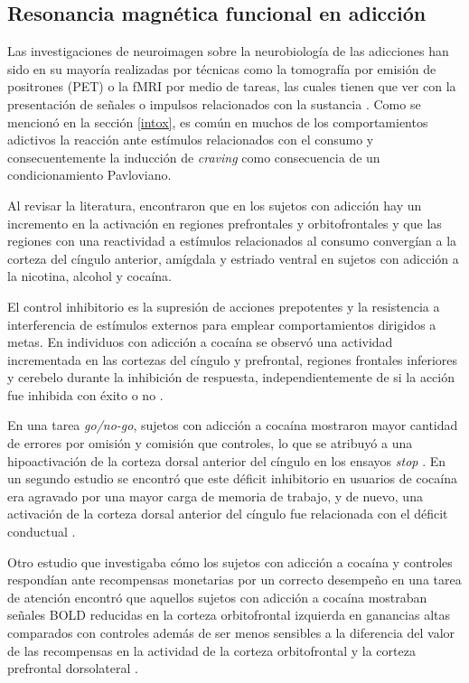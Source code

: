 \subsection{Resonancia magnética funcional en adicción}
Las investigaciones de neuroimagen sobre la neurobiología de las adicciones han sido en su mayoría realizadas por técnicas como la tomografía por emisión de positrones (PET) o la fMRI por medio de tareas, las cuales tienen que ver con la presentación de señales o impulsos relacionados con la sustancia \parencite{Jasinska2014}.
Como se mencionó en la sección \ref{intox}, es común en muchos de los comportamientos adictivos la reacción ante estímulos relacionados con el consumo y consecuentemente la inducción de \textit{craving} como consecuencia de un condicionamiento Pavloviano.\par
Al revisar la literatura, \textcite{Suckling2017} encontraron que en los sujetos con adicción hay un incremento en la activación en regiones prefrontales y orbitofrontales y que las regiones con una reactividad a estímulos relacionados al consumo convergían a la corteza del cíngulo anterior, amígdala y estriado ventral en sujetos con adicción a la nicotina, alcohol y cocaína. \par
El control inhibitorio es la supresión de acciones prepotentes y la resistencia a interferencia de estímulos externos para emplear comportamientos dirigidos a metas.
En individuos con adicción a cocaína se observó una actividad incrementada en las cortezas del cíngulo y prefrontal, regiones frontales inferiores y cerebelo durante la inhibición de respuesta, independientemente de si la acción fue inhibida con éxito o no \parencite{Suckling2017}.\par
En una tarea \textit{go/no-go}, sujetos con adicción a cocaína mostraron mayor cantidad de errores por omisión y comisión que controles, lo que se atribuyó a una hipoactivación de la corteza dorsal anterior del cíngulo en los ensayos \textit{stop} \parencite{Kaufman2003}.
En un segundo estudio se encontró que este déficit inhibitorio en usuarios de cocaína era agravado por una mayor carga de memoria de trabajo, y de nuevo, una activación de la corteza dorsal anterior del cíngulo fue relacionada con el déficit conductual \parencite{Hester2004}.\par
Otro estudio que investigaba cómo los sujetos con adicción a cocaína y controles respondían ante recompensas monetarias por un correcto desempeño en una tarea de atención encontró que aquellos sujetos con adicción a cocaína mostraban señales BOLD reducidas en la corteza orbitofrontal izquierda en ganancias altas comparados con controles además de ser menos sensibles a la diferencia del valor de las recompensas en la actividad de la corteza orbitofrontal y la corteza prefrontal dorsolateral \parencite{Goldstein2007}. \par
